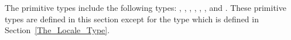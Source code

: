 The primitive types include the following types: ,
, , , , ,
and .  These primitive types are defined in this section
except for the  type which is defined in
Section~\ref{The_Locale_Type}.
